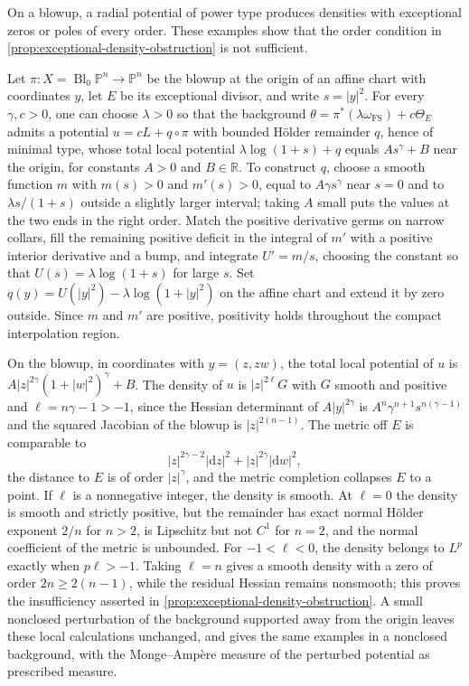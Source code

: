 On a blowup, a radial potential of power type produces densities with exceptional zeros or poles of every order. These examples show that the order condition in \cref{prop:exceptional-density-obstruction} is not sufficient.

\begin{example}\label{ex:power-blowup-family}
Let $\pi\colon X=\operatorname{Bl}_0\mathbb P^n\to\mathbb P^n$ be the blowup at the origin of an affine chart with coordinates $y$, let $E$ be its exceptional divisor, and write $s=|y|^2$. For every $\gamma,c>0$, one can choose $\lambda>0$ so that the background $\theta=\pi^*(\lambda\omega_{\mathrm{FS}})+c\Theta_E$ admits a potential $u=cL+q\circ\pi$ with bounded H\"older remainder $q$, hence of minimal type, whose total local potential $\lambda\log(1+s)+q$ equals $As^\gamma+B$ near the origin, for constants $A>0$ and $B\in\mathbb R$. To construct $q$, choose a smooth function $m$ with $m(s)>0$ and $m'(s)>0$, equal to $A\gamma s^\gamma$ near $s=0$ and to $\lambda s/(1+s)$ outside a slightly larger interval; taking $A$ small puts the values at the two ends in the right order. Match the positive derivative germs on narrow collars, fill the remaining positive deficit in the integral of $m'$ with a positive interior derivative and a bump, and integrate $U'=m/s$, choosing the constant so that $U(s)=\lambda\log(1+s)$ for large $s$. Set $q(y)=U(|y|^2)-\lambda\log(1+|y|^2)$ on the affine chart and extend it by zero outside. Since $m$ and $m'$ are positive, positivity holds throughout the compact interpolation region.

On the blowup, in coordinates with $y=(z,zw)$, the total local potential of $u$ is $A|z|^{2\gamma}(1+|w|^2)^\gamma+B$. The density of $u$ is $|z|^{2\ell}G$ with $G$ smooth and positive and $\ell=n\gamma-1>-1$, since the Hessian determinant of $A|y|^{2\gamma}$ is $A^n\gamma^{n+1}s^{n(\gamma-1)}$ and the squared Jacobian of the blowup is $|z|^{2(n-1)}$. The metric off $E$ is comparable to
\begin{equation}\label{eq:power-blowup-metric}
 |z|^{2\gamma-2}|\mathrm{d} z|^2+|z|^{2\gamma}|\mathrm{d} w|^2,
\end{equation}
the distance to $E$ is of order $|z|^\gamma$, and the metric completion collapses $E$ to a point. If $\ell$ is a nonnegative integer, the density is smooth. At $\ell=0$ the density is smooth and strictly positive, but the remainder has exact normal H\"older exponent $2/n$ for $n>2$, is Lipschitz but not $C^1$ for $n=2$, and the normal coefficient of the metric is unbounded. For $-1<\ell<0$, the density belongs to $L^p$ exactly when $p\ell>-1$. Taking $\ell=n$ gives a smooth density with a zero of order $2n\geq2(n-1)$, while the residual Hessian remains nonsmooth; this proves the insufficiency asserted in \cref{prop:exceptional-density-obstruction}. A small nonclosed perturbation of the background supported away from the origin leaves these local calculations unchanged, and gives the same examples in a nonclosed background, with the Monge--Amp\`ere measure of the perturbed potential as prescribed measure.
\end{example}

